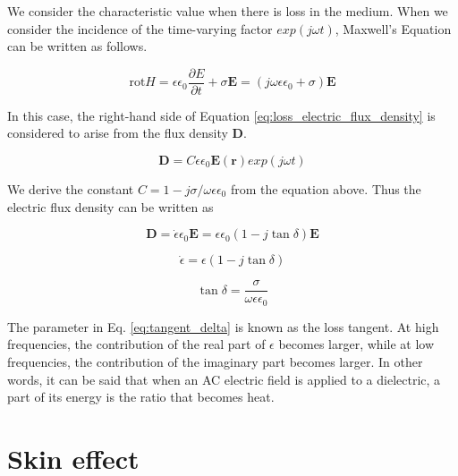 \documentclass[a4paper,12pt]{report}
\begin{document}
We consider the characteristic value when there is loss in the medium.
When we consider the incidence of the time-varying factor $exp(j\omega t)$,
Maxwell's Equation can be written as follows.

\begin{equation} \label{eq:loss_electric_flux_density}
  \mathrm{rot} H = \epsilon \epsilon_0 \frac{\partial E}{\partial t} + \sigma \boldsymbol{E} = (j\omega\epsilon\epsilon_0 + \sigma)\boldsymbol{E}
\end{equation}

In this case, the right-hand side of Equation \ref{eq:loss_electric_flux_density}
is considered to arise from the flux density $\boldsymbol{D}$.

\begin{equation} \label{eq:electric_flux_density}
  \boldsymbol{D} = C\epsilon \epsilon_0 \boldsymbol{E}(\boldsymbol{r})exp(j\omega t)
\end{equation}

We derive the constant $C=1 - j\sigma / \omega\epsilon\epsilon_0$ from the equation above.
Thus the electric flux density can be written as

\begin{equation} \label{eq:electric_flux_density_tangent_delta}
  \boldsymbol{D} = \dot{\epsilon} \epsilon_0 \boldsymbol{E} = \epsilon \epsilon_0 (1 - j\tan\delta)\boldsymbol{E}
\end{equation}

\begin{equation} \label{eq:epsilon_dot}
  \dot{\epsilon} = \epsilon (1 - j\tan\delta)
\end{equation}

\begin{equation} \label{eq:tangent_delta}
  \tan \delta = \frac{\sigma}{\omega\epsilon\epsilon_0}
\end{equation}

The parameter in Eq. \ref{eq:tangent_delta} is known as the loss tangent.
At high frequencies, the contribution of the real part of $\epsilon$ becomes larger,
while at low frequencies, the contribution of the imaginary part becomes larger.
In other words, it can be said that when an AC electric field is applied to a dielectric,
a part of its energy is the ratio that becomes heat.

\section{Skin effect}
\end{document}
